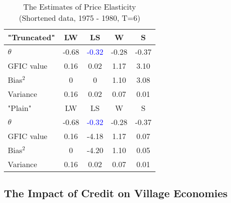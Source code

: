 \begin{table}[h!]\centering
 \caption{The Estimates of Price Elasticity (Shortened data, 1975 - 1980, T=6)}
\begin{tabular}{l c c c c }\hline\hline
"Truncated" & LW   &      LS   &       W   &      S\\
\hline
$\theta$ & -0.68 & \textcolor{blue}{ -0.32} &  -0.28 &  -0.37\\
\hline
GFIC value &0.16 & 0.02 & 1.17 & 3.10\\
Bias$^2$ & 0 & 0 & 1.10 & 3.08\\
Variance &0.16 & 0.02 & 0.07 & 0.01\\ 
\hline
"Plain" & LW   &      LS   &       W   &      S\\
\hline
$\theta$ & -0.68 & \textcolor{blue}{ -0.32} &  -0.28 &  -0.37\\
\hline
GFIC value &0.16 & -4.18 & 1.17 & 0.07\\
Bias$^2$ & 0 & -4.20 & 1.10 & 0.05\\
Variance &0.16 & 0.02 & 0.07 & 0.01\\ 

\hline
\hline
\end{tabular}
\end{table}


\subsection{The Impact of Credit on Village Economies}
\label{sec:townsend}

